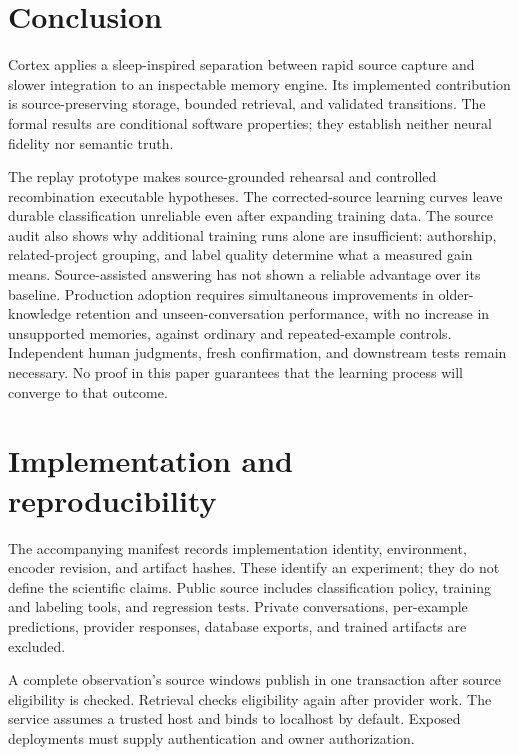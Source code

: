 \documentclass[11pt]{article}
\begin{document}
\noindent\begin{minipage}{\linewidth}
\section{Conclusion}
Cortex applies a sleep-inspired separation between rapid source capture and slower integration to an inspectable memory engine. Its implemented contribution is source-preserving storage, bounded retrieval, and validated transitions. The formal results are conditional software properties; they establish neither neural fidelity nor semantic truth.

The replay prototype makes source-grounded rehearsal and controlled recombination executable hypotheses. The corrected-source learning curves leave durable classification unreliable even after expanding training data. The source audit also shows why additional training runs alone are insufficient: authorship, related-project grouping, and label quality determine what a measured gain means. Source-assisted answering has not shown a reliable advantage over its baseline. Production adoption requires simultaneous improvements in older-knowledge retention and unseen-conversation performance, with no increase in unsupported memories, against ordinary and repeated-example controls. Independent human judgments, fresh confirmation, and downstream tests remain necessary. No proof in this paper guarantees that the learning process will converge to that outcome.

\end{minipage}

\appendix
\section{Implementation and reproducibility}
The accompanying manifest records implementation identity, environment, encoder revision, and artifact hashes. These identify an experiment; they do not define the scientific claims. Public source includes classification policy, training and labeling tools, and regression tests. Private conversations, per-example predictions, provider responses, database exports, and trained artifacts are excluded.

A complete observation's source windows publish in one transaction after source eligibility is checked. Retrieval checks eligibility again after provider work. The service assumes a trusted host and binds to localhost by default. Exposed deployments must supply authentication and owner authorization.
\end{document}
